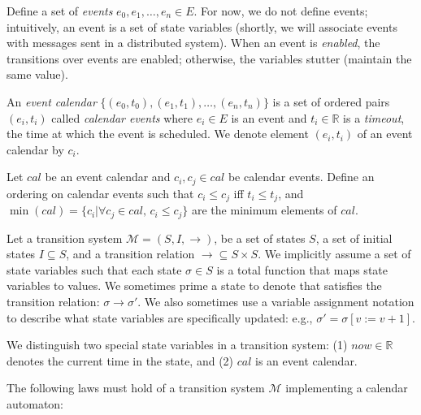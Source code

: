 \documentclass{llncs/llncs}
\begin{document}


Define a set of \emph{events} $e_0, e_1, \ldots, e_n \in E$. For now, we do not define events; intuitively, an event is a set of state variables (shortly, we will associate events with messages sent in a distributed system). When an event is \emph{enabled}, the transitions over events are enabled; otherwise, the variables stutter (maintain the same value).

An \emph{event calendar} $\{ (e_0, t_0), (e_1, t_1), \ldots, (e_n, t_n) \}$ is a set of ordered pairs $(e_i, t_i)$ called \emph{calendar events} where $e_i \in E$ is an event and $t_i \in \mathbb{R}$ is a \emph{timeout}, the time at which the event is scheduled. We denote element $(e_i, t_i)$ of an event calendar by $c_i$.

Let $cal$ be an event calendar and $c_i, c_j \in cal$ be calendar events. Define an ordering on calendar events such that $c_i \leq c_j$ iff $t_i \leq t_j$, and $\min(cal) = \{ c_i | \forall c_j \in cal, \, c_i \leq c_j  \}$ are the minimum elements of $cal$.

Let a transition system $\mathcal{M} = (S, I, \rightarrow)$, be a set of states $S$, a set of initial states $I \subseteq S$, and a transition relation $\rightarrow \subseteq S \times S$. We implicitly assume a set of state variables such that each state $\sigma \in S$ is a total function that maps state variables to values. We sometimes prime a state to denote that satisfies the transition relation: $\sigma \rightarrow \sigma'$. We also sometimes use a variable assignment notation to describe what state variables are specifically updated: e.g., $\sigma' = \sigma[v := v+1]$.

We distinguish two special state variables in a transition system: (1) $now \in \mathbb{R}$ denotes the current time in the state, and (2) $cal$ is an event calendar.

The following laws must hold of a transition system $\mathcal{M}$ implementing a calendar automaton:
\end{document}
